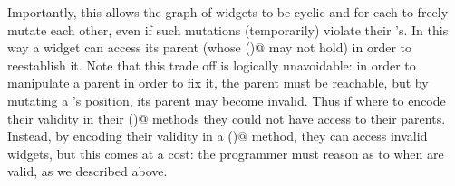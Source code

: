 Importantly, this allows the graph of widgets to be cyclic and for each to freely mutate each
other, even if such mutations (temporarily) violate their \Q@subInvariant@'s.
In this way a widget can access its parent (whose \Q@subInvariant()@ may not hold) in order to reestablish it.
Note that this trade off is logically unavoidable:
in order to manipulate a parent in order to fix it, the parent must be reachable, but
by mutating a \Q@Widget@'s position, its parent may become invalid.
Thus if \Q@Widget@s where to encode their validity in their \Q@invariant()@ methods they could not have access to their parents.
Instead, by encoding their validity in a \Q@subInvariant()@ method,
they can access invalid widgets, but this comes at a cost: the programmer must
reason as to when \Q@Widgets@ are valid, as we described above.


